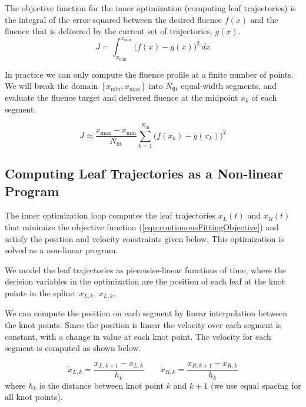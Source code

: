\documentclass[12pt]{article}
\begin{document}
The objective function for the inner optimization (computing leaf trajectories)
is the integral of the error-squared between the desired fluence $f(x)$ and the fluence that
is delivered by the current set of trajectories, $g(x)$.
\begin{equation}
  J = \int_{x_\text{min}}^{x_\text{max}} \! \bigg( f(x) - g(x) \bigg)^2 \,dx
  \label{eqn:continuousFittingObjective}
\end{equation}

In practice we can only compute the fluence profile at a finite number of points. We will break the domain $[x_\text{min}, x_\text{max}]$ into $N_\text{fit}$ equal-width segments,
and evaluate the fluence target and delivered fluence at the midpoint $x_k$ of each segment.

\begin{equation}
  J \approx \frac{x_\text{max} - x_\text{min}}{N_\text{fit}}
  \sum_{k = 1}^{N_\text{fit}} \! \bigg( f(x_k) - g(x_k) \bigg)^2
  \label{eqn:discreteFittingObjective}
\end{equation}

\subsection{Computing Leaf Trajectories as a Non-linear Program}
\label{sec:LeafTrajectoryAsNLP}

The inner optimization loop computes the leaf trajectories $x_L(t)$ and $x_R(t)$
that minimize the objective function (\ref{eqn:continuousFittingObjective})
and satisfy the position and velocity constraints given below.
This optimization is solved as a non-linear program.

We model the leaf trajectories as piecewise-linear functions of time,
where the decision variables in the optimization are the position of each leaf
at the knot points in the spline: $x_{L, k}$, $x_{L, k}$.

We can compute the position on each segment by linear interpolation between the knot points.
Since the position is linear the velocity over each segment is constant,
with a change in value at each knot point.
The velocity for each segment is computed as shown below.

\begin{equation}
  \dot{x}_{L, k} = \frac{x_{L, k+1} - x_{L, k}}{h_k}
  \quad \quad
  \dot{x}_{R, k} = \frac{x_{R, k+1} - x_{R, k}}{h_k}
\end{equation}
\noindent where $h_k$ is the distance between knot point $k$ and $k+1$ (we use equal spacing for all knot points).
\end{document}
